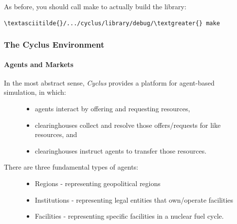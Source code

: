 \documentclass[letterpaper,10pt,english]{sphinxmanual}
\begin{document}
As before, you should call make to actually build the library:

\begin{Verbatim}[commandchars=\\\{\}]
\textasciitilde{}/.../cyclus/library/debug/\textgreater{} make
\end{Verbatim}


\subsubsection{The Cyclus Environment}
\label{devdoc/cyclus_env::doc}\label{devdoc/cyclus_env:the-cyclus-environment}

\paragraph{Agents and Markets}
\label{devdoc/cyclus_env:agents-and-markets}\begin{description}
\item[{In the most abstract sense, \emph{Cyclus} provides a platform for agent-based simulation, in which:}] \leavevmode\begin{itemize}
\item {} 
agents interact by offering and requesting resources,

\item {} 
clearinghouses collect and resolve those offers/requests for like resources, and

\item {} 
clearinghouses instruct agents to transfer those resources.

\end{itemize}

\item[{There are three fundamental types of agents:}] \leavevmode\begin{itemize}
\item {} 
Regions - representing geopolitical regions

\item {} 
Institutions - representing legal entities that own/operate facilities

\item {} 
Facilities - representing specific facilities in a nuclear fuel cycle.

\end{itemize}

\end{description}
\end{document}
